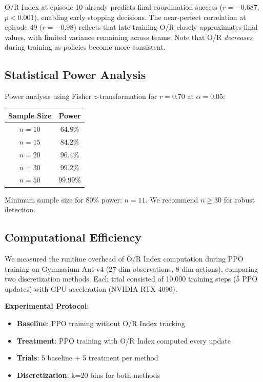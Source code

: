 \documentclass[twoside]{article}
\theoremstyle{remark}
\begin{document}
O/R Index at episode 10 already predicts final coordination success ($r = -0.687$, $p < 0.001$), enabling early stopping decisions. The near-perfect correlation at episode 49 ($r = -0.98$) reflects that late-training O/R closely approximates final values, with limited variance remaining across teams. Note that O/R \textit{decreases} during training as policies become more consistent.

\subsection{Statistical Power Analysis}

Power analysis using Fisher $z$-transformation for $r = 0.70$ at $\alpha = 0.05$:

\begin{center}
\begin{tabular}{cc}
\toprule
\textbf{Sample Size} & \textbf{Power} \\
\midrule
$n = 10$ & $64.8\%$ \\
$n = 15$ & $84.2\%$ \\
$n = 20$ & $96.4\%$ \\
$n = 30$ & $99.2\%$ \\
$n = 50$ & $99.99\%$ \\
\bottomrule
\end{tabular}
\end{center}

Minimum sample size for 80\% power: $n = 11$. We recommend $n \geq 30$ for robust detection.

\subsection{Computational Efficiency}
\label{app:computational_efficiency}

We measured the runtime overhead of O/R Index computation during PPO training on Gymnasium Ant-v4 (27-dim observations, 8-dim actions), comparing two discretization methods. Each trial consisted of 10,000 training steps (5 PPO updates) with GPU acceleration (NVIDIA RTX 4090).

\textbf{Experimental Protocol}:
\begin{itemize}
    \item \textbf{Baseline}: PPO training without O/R Index tracking
    \item \textbf{Treatment}: PPO training with O/R Index computed every update
    \item \textbf{Trials}: 5 baseline + 5 treatment per method
    \item \textbf{Discretization}: k=20 bins for both methods
\end{itemize}
\end{document}
